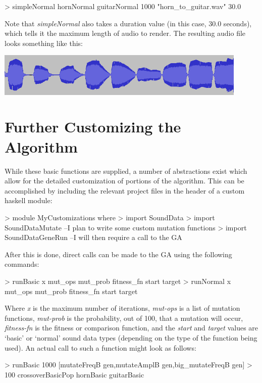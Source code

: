 \documentclass[11pt]{article}
\begin{document}
\begin{code}
> simpleNormal hornNormal guitarNormal 1000 "horn_to_guitar.wav" 30.0 
\end{code}

Note that \emph{simpleNormal} also takes a duration value (in this case, 30.0 seconds), which tells it the maximum length of audio to render.
The resulting audio file looks something like this:

\includegraphics[width=120mm]{normal_wav.png}

\section{Further Customizing the Algorithm}

While these basic functions are supplied, a number of abstractions exist which allow for the detailed customization of portions of the algorithm. This can be accomplished by including the relevant project files in the header of a custom haskell module:

\begin{code}
> module MyCustomizations where
> import SoundData
> import SoundDataMutate --I plan to write some custom mutation functions
> import SoundDataGeneRun --I will then require a call to the GA
\end{code}

After this is done, direct calls can be made to the GA using the following commands:

\begin{code}
> runBasic  x mut_ops mut_prob fitness_fn start target
> runNormal x mut_ops mut_prob fitness_fn start target
\end{code}

Where \emph{x} is the maximum number of iterations, \emph{mut-ops} is a list of mutation functions, \emph{mut-prob} is the probability, out of 100, that a mutation will occur, \emph{fitness-fn} is the fitness or comparison function, and the \emph{start} and \emph{target} values are `basic' or `normal' sound data types (depending on the type of the function being used). An actual call to such a function might look as follows:

\begin{code}
> runBasic 1000 [mutateFreqB gen,mutateAmplB gen,big_mutateFreqB gen]
>            100 crossoverBasicPop hornBasic guitarBasic
\end{code}
\end{document}
